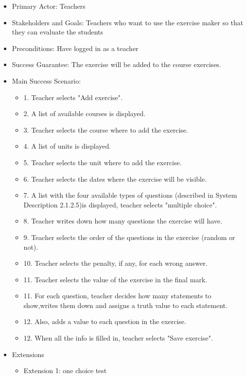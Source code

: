 \documentclass{article}
\begin{document}
\begin{enumerate}
\begin{enumerate}
\begin{enumerate}
			\begin{itemize}
				\item Primary Actor: Teachers
				\item Stakeholders and Goals: Teachers who want to use the exercise maker so that they can evaluate the students
				\item Preconditions: Have logged in as a teacher
				\item Success Guarantee: The exercise will be added to the course exercises.
				\item Main Success Scenario:
				\begin{itemize}
					\item 1. Teacher selects "Add exercise".
					\item 2. A list of available courses is displayed.
					\item 3. Teacher selects the course where to add the exercise.
					\item 4. A list of units is displayed.
					\item 5. Teacher selects the unit where to add the exercise.
					\item 6. Teacher selects the dates where the exercise will be visible.
					\item 7. A list with the four available types of questions (described in System Description 2.1.2.5)is displayed, teacher selects "multiple choice".
					\item 8. Teacher writes down how many questions the exercise will have.
					\item 9. Teacher selects the order of the questions in the exercise (random or not).
					\item 10. Teacher selects the penalty, if any, for each wrong answer.
					\item 11. Teacher selects the value of the exercise in the final mark.
					\item 11. For each question, teacher decides how many statements to show,writes them down and assigns a truth value to each statement.
					\item 12. Also, adds a value to each question in the exercise.
					\item 12. When all the info is filled in, teacher selects "Save exercise". 
				\end{itemize}
				\item{Extensions}
				\begin{itemize}
					\item Extension 1: one choice test
					\begin{itemize}

\end{itemize}
\end{itemize}
\end{itemize}
\end{enumerate}
\end{enumerate}
\end{enumerate}
\end{document}
